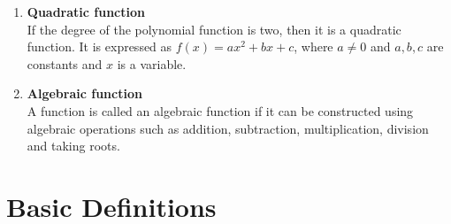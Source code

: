 \documentclass[12pt]{report}
\newcommand{\bt}[1]{\textbf{#1}}
\begin{document}
\begin{enumerate}
		\item\bt{Quadratic function}\\
		If the degree of the polynomial function is two, then it is a quadratic function. It is expressed as $f(x)=ax^2 + bx + c$, where $a\neq 0$ and $a,b,c$ are constants and $x$ is a variable.
		
		\item\bt{Algebraic function}\\
		A function is called an algebraic function if it can be constructed using algebraic operations such as addition, subtraction, multiplication, division and taking roots.
	\end{enumerate}
	
	\section{Basic Definitions}
\end{document}
